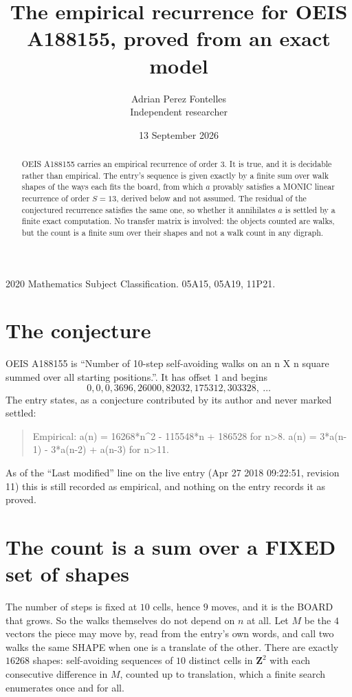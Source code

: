 \documentclass[11pt,a4paper]{article}
\title{The empirical recurrence for OEIS A188155, proved from an exact model}
\author{Adrian Perez Fontelles\\ \small Independent researcher}
\date{13 September 2026}
\theoremstyle{plain}
\theoremstyle{definition}
\begin{document}
\maketitle

\begin{abstract}
OEIS A188155 carries an empirical recurrence of order $3$. It is true, and it is
decidable rather than empirical. The entry's sequence is given exactly by a finite sum over walk shapes of the ways each fits the board, from
which $a$ provably satisfies a MONIC linear recurrence of order $S=13$, derived below and not
assumed. The residual of the conjectured recurrence satisfies the same one, so whether it
annihilates $a$ is settled by a finite exact computation. No transfer matrix is involved: the objects counted are walks, but the count is a finite sum over their shapes and not a walk count in any digraph.
\end{abstract}

\noindent\small 2020 Mathematics Subject Classification. 05A15, 05A19, 11P21.\normalsize

\section{The conjecture}

OEIS A188155 is ``Number of 10-step self-avoiding walks on an n X n square summed over all starting positions.''. It has offset $1$ and begins
\[
0, 0, 0, 3696, 26000, 82032, 175312, 303328,\ \dots
\]
The entry states, as a conjecture contributed by its author and never marked settled:
\begin{quote}
Empirical: a(n) = 16268*n\^{}2 - 115548*n + 186528 for n>8. a(n) = 3*a(n-1) - 3*a(n-2) + a(n-3) for n>11.
\end{quote}
As of the ``Last modified'' line on the live entry (Apr 27 2018 09:22:51, revision 11)
this is still recorded as empirical, and nothing on the entry records it as proved.

\section{The count is a sum over a FIXED set of shapes}

The number of steps is fixed at $10$ cells, hence $9$ moves, and it is the BOARD
that grows. So the walks themselves do not depend on $n$ at all. Let $M$ be the $4$
vectors the piece may move by, read from the entry's own words, and call two walks the same
SHAPE when one is a translate of the other. There are exactly $16268$ shapes: self-avoiding
sequences of $10$ distinct cells in $\mathbf{Z}^{2}$ with each consecutive difference in
$M$, counted up to translation, which a finite search enumerates once and for all.
\end{document}
